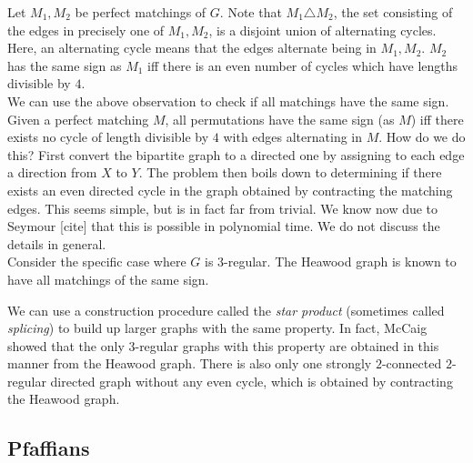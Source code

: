 Let $M_1,M_2$ be perfect matchings of $G$. Note that $M_1 \triangle M_2$, the set consisting of the edges in precisely one of $M_1,M_2$, is a disjoint union of alternating cycles. Here, an alternating cycle means that the edges alternate being in $M_1,M_2$. $M_2$ has the same sign as $M_1$ iff there is an even number of cycles which have lengths divisible by $4$.\\
We can use the above observation to check if all matchings have the same sign. Given a perfect matching $M$, all permutations have the same sign (as $M$) iff there exists no cycle of length divisible by $4$ with edges alternating in $M$. How do we do this? First convert the bipartite graph to a directed one by assigning to each edge a direction from $X$ to $Y$. The problem then boils down to determining if there exists an even directed cycle in the graph obtained by contracting the matching edges. This seems simple, but is in fact far from trivial. We know now due to Seymour [cite] that this is possible in polynomial time. We do not discuss the details in general. \\
Consider the specific case where $G$ is $3$-regular. The Heawood graph is known to have all matchings of the same sign.

We can use a construction procedure called the \emph{star product} (sometimes called \emph{splicing}) to build up larger graphs with the same property. In fact, McCaig showed that the only $3$-regular graphs with this property are obtained in this manner from the Heawood graph. There is also only one strongly $2$-connected $2$-regular directed graph without any even cycle, which is obtained by contracting the Heawood graph. %


\subsection{Pfaffians}

